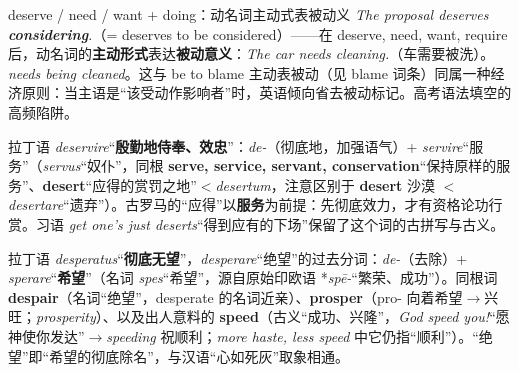 \documentclass[../main.tex]{subfiles}
\begin{document}


\begin{gram}{deserve / need / want + doing：动名词主动式表被动义}
\textit{The proposal deserves \textbf{considering}.}（= deserves to be considered）——在 deserve, need, want, require 后，动名词的\textbf{主动形式}表达\textbf{被动意义}：\textit{The car needs cleaning.}（车需要被洗）。 \textit{needs being cleaned}。这与 be to blame 主动表被动（见 blame 词条）同属一种经济原则：当主语是“该受动作影响者”时，英语倾向省去被动标记。高考语法填空的高频陷阱。
\end{gram}

\begin{origin}
拉丁语 \textit{deservire}“\textbf{殷勤地侍奉、效忠}”：\textit{de-}（彻底地，加强语气）+ \textit{servire}“服务”（\textit{servus}“奴仆”，同根 \textbf{serve, service, servant, conservation}“保持原样的服务”、\textbf{desert}“应得的赏罚之地”$<$\textit{desertum}，注意区别于 \textbf{desert} 沙漠 $<$\textit{desertare}“遗弃”）。古罗马的“应得”以\textbf{服务}为前提：先彻底效力，才有资格论功行赏。习语 \textit{get one's just deserts}“得到应有的下场”保留了这个词的古拼写与古义。
\end{origin}






\begin{origin}
拉丁语 \textit{desperatus}“\textbf{彻底无望}”，\textit{desperare}“绝望”的过去分词：\textit{de-}（去除）+ \textit{sperare}“\textbf{希望}”（名词 \textit{spes}“希望”，源自原始印欧语 *\textit{spē-}“繁荣、成功”）。同根词 \textbf{despair}（名词“绝望”，desperate 的名词近亲）、\textbf{prosper}（pro- 向着希望$\to$兴旺；\textit{prosperity}）、以及出人意料的 \textbf{speed}（古义“成功、兴隆”，\textit{God speed you!}“愿神使你发达”$\to$\textit{speeding} 祝顺利；\textit{more haste, less speed} 中它仍指“顺利”）。“绝望”即“希望的彻底除名”，与汉语“心如死灰”取象相通。
\end{origin}
\end{document}
